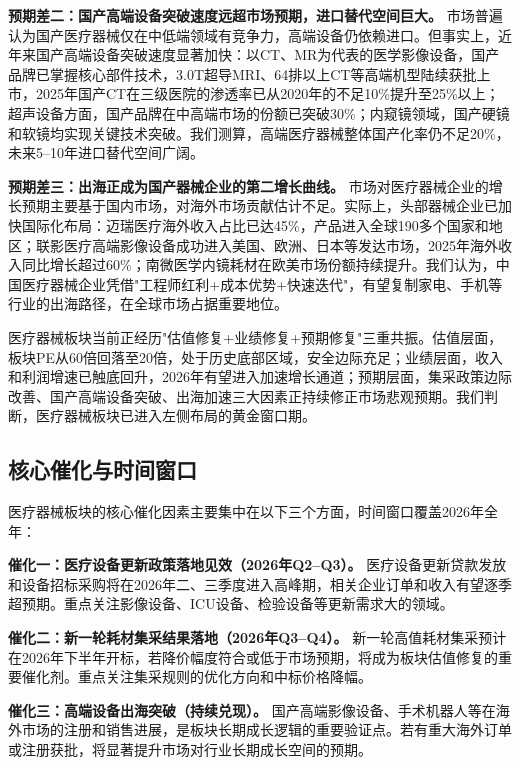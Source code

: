 \textbf{预期差二：国产高端设备突破速度远超市场预期，进口替代空间巨大。} 市场普遍认为国产医疗器械仅在中低端领域有竞争力，高端设备仍依赖进口。但事实上，近年来国产高端设备突破速度显著加快：以CT、MR为代表的医学影像设备，国产品牌已掌握核心部件技术，3.0T超导MRI、64排以上CT等高端机型陆续获批上市，2025年国产CT在三级医院的渗透率已从2020年的不足10\%提升至25\%以上；超声设备方面，国产品牌在中高端市场的份额已突破30\%；内窥镜领域，国产硬镜和软镜均实现关键技术突破。我们测算，高端医疗器械整体国产化率仍不足20\%，未来5--10年进口替代空间广阔。

\textbf{预期差三：出海正成为国产器械企业的第二增长曲线。} 市场对医疗器械企业的增长预期主要基于国内市场，对海外市场贡献估计不足。实际上，头部器械企业已加快国际化布局：迈瑞医疗海外收入占比已达45\%，产品进入全球190多个国家和地区；联影医疗高端影像设备成功进入美国、欧洲、日本等发达市场，2025年海外收入同比增长超过60\%；南微医学内镜耗材在欧美市场份额持续提升。我们认为，中国医疗器械企业凭借"工程师红利+成本优势+快速迭代"，有望复制家电、手机等行业的出海路径，在全球市场占据重要地位。

\begin{keyinsight}
医疗器械板块当前正经历"估值修复+业绩修复+预期修复"三重共振。估值层面，板块PE从60倍回落至20倍，处于历史底部区域，安全边际充足；业绩层面，收入和利润增速已触底回升，2026年有望进入加速增长通道；预期层面，集采政策边际改善、国产高端设备突破、出海加速三大因素正持续修正市场悲观预期。我们判断，医疗器械板块已进入左侧布局的黄金窗口期。
\end{keyinsight}

\subsection{核心催化与时间窗口}

医疗器械板块的核心催化因素主要集中在以下三个方面，时间窗口覆盖2026年全年：

\textbf{催化一：医疗设备更新政策落地见效（2026年Q2--Q3）。} 医疗设备更新贷款发放和设备招标采购将在2026年二、三季度进入高峰期，相关企业订单和收入有望逐季超预期。重点关注影像设备、ICU设备、检验设备等更新需求大的领域。

\textbf{催化二：新一轮耗材集采结果落地（2026年Q3--Q4）。} 新一轮高值耗材集采预计在2026年下半年开标，若降价幅度符合或低于市场预期，将成为板块估值修复的重要催化剂。重点关注集采规则的优化方向和中标价格降幅。

\textbf{催化三：高端设备出海突破（持续兑现）。} 国产高端影像设备、手术机器人等在海外市场的注册和销售进展，是板块长期成长逻辑的重要验证点。若有重大海外订单或注册获批，将显著提升市场对行业长期成长空间的预期。

